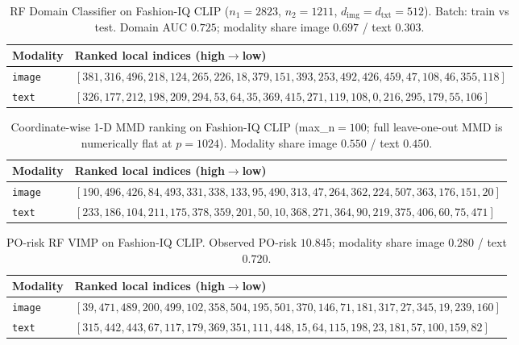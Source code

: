 
\begin{table}[ht]
\centering
\caption{RF Domain Classifier on Fashion-IQ CLIP ($n_1=2823$, $n_2=1211$, $d_{\mathrm{img}}=d_{\mathrm{txt}}=512$). Batch: train vs test. Domain AUC $0.725$; modality share image $0.697$ / text $0.303$.}
\label{tab:fashion-iq-rf-domain}
\small
\begin{tabular}{@{}l p{11.5cm}@{}}
\toprule
Modality & Ranked local indices (high$\to$low) \\
\midrule
\texttt{image} & $[381,316,496,218,124,265,226,18,379,151,393,253,492,426,459,47,108,46,355,118]$ \\
\texttt{text} & $[326,177,212,198,209,294,53,64,35,369,415,271,119,108,0,216,295,179,55,106]$ \\
\bottomrule
\end{tabular}
\end{table}

\begin{table}[ht]
\centering
\caption{Coordinate-wise 1-D MMD ranking on Fashion-IQ CLIP (max\_n$=100$; full leave-one-out MMD is numerically flat at $p=1024$). Modality share image $0.550$ / text $0.450$.}
\label{tab:fashion-iq-coord-mmd}
\small
\begin{tabular}{@{}l p{11.5cm}@{}}
\toprule
Modality & Ranked local indices (high$\to$low) \\
\midrule
\texttt{image} & $[190,496,426,84,493,331,338,133,95,490,313,47,264,362,224,507,363,176,151,20]$ \\
\texttt{text} & $[233,186,104,211,175,378,359,201,50,10,368,271,364,90,219,375,406,60,75,471]$ \\
\bottomrule
\end{tabular}
\end{table}

\begin{table}[ht]
\centering
\caption{PO-risk RF VIMP on Fashion-IQ CLIP. Observed PO-risk $10.845$; modality share image $0.280$ / text $0.720$.}
\label{tab:fashion-iq-po-risk}
\small
\begin{tabular}{@{}l p{11.5cm}@{}}
\toprule
Modality & Ranked local indices (high$\to$low) \\
\midrule
\texttt{image} & $[39,471,489,200,499,102,358,504,195,501,370,146,71,181,317,27,345,19,239,160]$ \\
\texttt{text} & $[315,442,443,67,117,179,369,351,111,448,15,64,115,198,23,181,57,100,159,82]$ \\
\bottomrule
\end{tabular}
\end{table}

